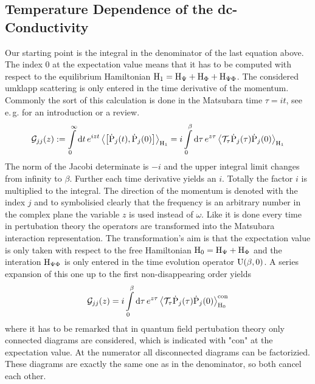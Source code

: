 \subsection{Temperature Dependence of the dc-Conductivity}
\label{subsec: temperature dependence of the dc-conductivity}
%
%
Our starting point is the integral in the denominator of the last equation above.
The index $0$ at the expectation value means that it has to be computed with respect to the equilibrium Hamiltonian $\mathrm{H}_{1} = \mathrm{H}_{\Psi} + \mathrm{H}_{\Phi} + \mathrm{H}_{\Psi\Phi}$.
The considered umklapp scattering is only entered in the time derivative of the momentum.
Commonly the sort of this calculation is done in the Matsubara time $\tau = it$, see e.\,g. \cite{Bruus&Flensberg} for an introduction or a review.
%
\begin{align}
	\mathcal{G}_{jj}(z) :=  \int\limits_{0}^{\infty} \dd{t} e^{iz t} \expval{\comm{\dot{\mt{P}}_{j}(t)}{\dot{\mt{P}}_{j}(0)}}_{\mt{H}_{1}} = i \int\limits_{0}^{\beta} \dd{\tau} e^{z \tau} \expval{\mathcal{T}_{\tau} \dot{\mt{P}}_{j}(\tau) \dot{\mt{P}}_{j}(0)}_{\mt{H}_{1}}
\end{align}
%
The norm of the Jacobi determinate is $-i$ and the upper integral limit changes from infinity to $\beta$.
Further each time derivative yields an $i$.
Totally the factor $i$ is multiplied to the integral.
The direction of the momentum is denoted with the index $j$ and to symbolisied clearly that the frequency is an arbitrary number in the complex plane the variable $z$ is used instead of $\omega$.
Like it is done every time in pertubation theory the operators are transformed into the Matsubara interaction representation.
The transformation's aim is that the expectation value is only taken with respect to the free Hamiltonian $\mathrm{H}_{0} = \mathrm{H}_{\Psi} + \mathrm{H}_{\Phi}$ and the interation $\mathrm{H}_{\Psi\Phi}$ is only entered in the time evolution operator $\mathrm{U}(\beta,0)$.
A series expansion of this one up to the first non-disappearing order yields
%
\begin{align}
	\mathcal{G}_{jj}(z) = i \int\limits_{0}^{\beta} \dd{\tau} e^{z \tau} \expval{\mathcal{T}_{\tau} \dot{\mathrm{P}}_{j}(\tau) \dot{\mathrm{P}}_{j}(0)}_{\mathrm{H}_{0}}^{\mathrm{con}}
\end{align}
%
where it has to be remarked that in quantum field pertubation theory only connected diagrams are considered, which is indicated with "con" at the expectation value.
At the numerator all disconnected diagrams can be factorizied.
These diagrams are exactly the same one as in the denominator, so both cancel each other.

